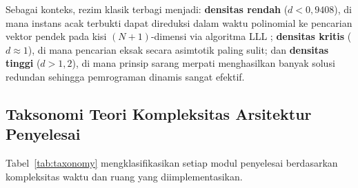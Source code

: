 \documentclass[journal,onecolumn,11pt]{IEEEtran}
\begin{document}
Sebagai konteks, rezim klasik terbagi menjadi: \textbf{densitas rendah} ($d < 0{,}9408$), di mana instans acak terbukti dapat direduksi dalam waktu polinomial ke pencarian vektor pendek pada kisi $(N{+}1)$-dimensi via algoritma LLL \cite{lagarias1985solving, coster1992improved}; \textbf{densitas kritis} ($d \approx 1$), di mana pencarian eksak secara asimtotik paling sulit; dan \textbf{densitas tinggi} ($d>1{,}2$), di mana prinsip sarang merpati menghasilkan banyak solusi redundan sehingga pemrograman dinamis sangat efektif.

\subsection{Taksonomi Teori Kompleksitas Arsitektur Penyelesai}
Tabel~\ref{tab:taxonomy} mengklasifikasikan setiap modul penyelesai berdasarkan kompleksitas waktu dan ruang yang diimplementasikan.
\end{document}
